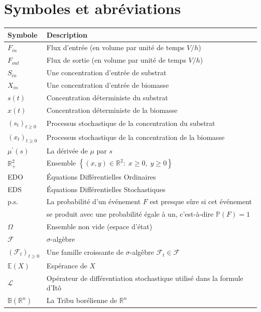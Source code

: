 \documentclass[12pt,a4paper]{report}%
\begin{document}
\chapter*{Symboles et abréviations}
\begin{tabular}{ll}
	\hline 
	\hline
	\textbf{Symbole} & \textbf{Description} \\
	\hline 
	\hline
	
	$F_{in}$ & Flux d'entrée (en volume par unité de temps $V/h$)
	\\
	$F_{out}$ & Flux de sortie (en volume par unité de temps $V/h$)
	\\
	$S_{in}$ & Une concentration d'entrée de substrat
	\\
	$X_{in}$ & Une concentration d'entrée de biomasse
	\\
	$s(t)$ & Concentration déterministe du substrat 
	\\
    $x(t)$ & Concentration déterministe de la biomasse \\
$(s_t)_{t\geqslant 0}$ & Processus stochastique de la concentration du substrat 
     \\
$(x_t)_{t\geqslant 0}$ & Processus stochastique de la concentration de la biomasse 
	\\
	$\mu^{\prime}(s)$ & La dérivée de $\mu$ par $s$
	\\
	$\mathbb{R}^2_{+}$ & Ensemble $\left\lbrace (x,y)\in \mathbb{R}^2 : \; x\geq 0 ,\; y \geq 0 \right\rbrace $
	\\
	EDO & Équations Différentielles Ordinaires
	\\
	EDS & Équations Différentielles Stochastiques
	\\
   p.s. &  La probabilité d'un événement \( F \) est presque sûre si cet événement\\
   & se produit avec une probabilité égale à un, c'est-à-dire \( \mathbb{P}(F) = 1 \)
   \\
   $\Omega$ & Ensemble non vide (espace d'état)
   \\
   $\mathcal{F}$ & $\sigma$-algèbre
   \\
   $(\mathcal{F}_t)_{t\geq 0}$ & Une famille croissante de $\sigma$-algèbre $\mathcal{F}_t \in \mathcal{F}$
   \\
   $ \mathbb{E}(X)$ & Espérance de $X$
   \\
$\mathcal{L}$ & Opérateur de différentiation stochastique utilisé dans la formule d'Itô
  \\
  $\mathbb{B}(\mathbb{R}^n)$ & La Tribu borélienne de $\mathbb{R}^n$

\end{tabular}
\end{document}
